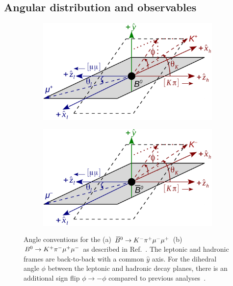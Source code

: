 \subsection{Angular distribution and observables}
\label{sec:kpimm:angular-distribution}

\begin{figure}
\centering
\begin{subfigure}{0.49\textwidth}
\includegraphics[width=\textwidth]{figs/kpimm/angular-distribution/angles_bz.pdf}
\caption{}
\label{fig:angle_conventions:bzb}
\end{subfigure}
\begin{subfigure}{0.49\textwidth}
\centering
\includegraphics[width=\textwidth]{figs/kpimm/angular-distribution/angles_bzb.pdf}
\caption{}
\label{fig:angle_conventions:bz}
\end{subfigure}
\caption{Angle conventions for the (a) ${{\kern 0.18em\overline{\kern -0.18em B}{}}{}^0} \rightarrow {\ensuremath{{K}^-}} {\ensuremath{{\pi}^+}} {\ensuremath{\mu^-}} {\ensuremath{\mu^+}}$ (b)  ${{B}^0} \rightarrow {\ensuremath{{K}^+}} {\ensuremath{{\pi}^-}} {\ensuremath{\mu^+}} {\ensuremath{\mu^-}}$ as described in Ref.~\cite{biplab}. The leptonic and hadronic frames are back-to-back with a common $\hat{y}$ axis. For the dihedral angle $\phi$ between the leptonic and hadronic decay planes, there is an additional sign flip $\phi\to -\phi$ compared to previous \lhcb analyses~\cite{kstmm-0.3fb,kstmm-1fb,kstmm-1fb-pprime,kstmm-3fb}.
}
\label{fig:angle_conventions}
\end{figure}

